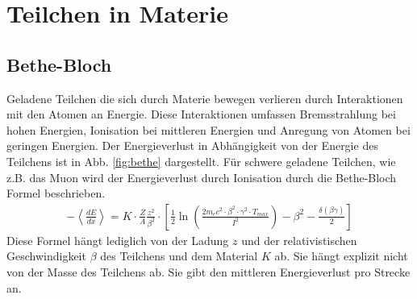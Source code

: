 \section{Teilchen in Materie}
\subsection{Bethe-Bloch}
Geladene Teilchen die sich durch Materie bewegen verlieren durch Interaktionen mit den Atomen an Energie. Diese Interaktionen umfassen Bremsstrahlung bei hohen Energien, Ionisation bei mittleren Energien und Anregung von Atomen bei geringen Energien. Der Energieverlust in Abhängigkeit von der Energie des Teilchens ist in Abb. \ref{fig:bethe} dargestellt. Für schwere geladene Teilchen, wie z.B. das Muon wird der Energieverlust durch Ionisation durch die Bethe-Bloch Formel beschrieben\cite{Passage_through_matter}.
\begin{align}
- \left<\frac{dE}{dx}\right> =  K\cdot \frac{Z}{A}\frac{z^2}{\beta^2} \cdot \left[ \frac12\ln \left(\frac{2m_ec^2\cdot\beta^2\cdot\gamma^2 \cdot T_{max}}{I^2}\right) - \beta^2 - \frac{\delta(\beta\gamma)}{2}\right] \label{eq:bethe}
\end{align} 
Diese Formel hängt lediglich von der Ladung $z$ und der relativistischen Geschwindigkeit $\beta$ des Teilchens und dem Material $K$ ab. Sie hängt explizit nicht von der Masse des Teilchens ab. Sie gibt den mittleren Energieverlust pro Strecke an. 
